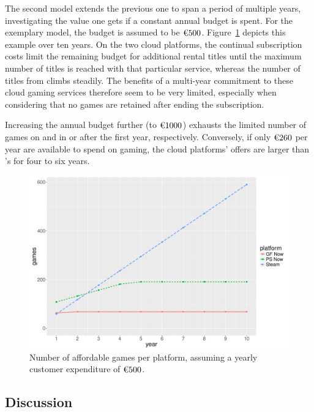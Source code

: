 The second model extends the previous one to span a period of multiple years, investigating the value one gets if a constant annual budget is spent. For the exemplary model, the budget is assumed to be $\text{\texteuro} 500$.
Figure~\ref{fig:games-over-years} depicts this example over ten years. On the two cloud platforms, the continual subscription costs limit the remaining budget for additional rental titles until the maximum number of titles is reached with that particular service, whereas the number of titles from \steam climbs steadily. The benefits of a multi-year commitment to these cloud gaming services therefore seem to be very limited, especially when considering that no games are retained after ending the subscription.

Increasing the annual budget further (to $\text{\texteuro} 1000$) exhausts the limited number of games on \psnow and \gfnow in or after the first year, respectively. Conversely, if only $\text{\texteuro} 260$ per year are available to spend on gaming, the cloud platforms' offers are larger than \steam's for four to six years.

\begin{figure}[!t]
	\centering
	\includegraphics[width=1.0\columnwidth]{images/games-over-year.pdf}
	\caption{Number of affordable games per platform, assuming a yearly customer expenditure of $\text{\texteuro} 500$.}
\label{fig:games-over-years}
\end{figure}



\subsection{Discussion}

